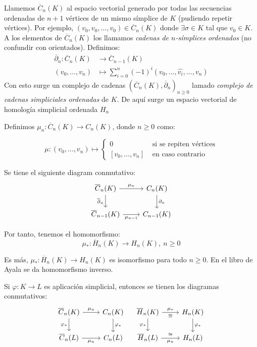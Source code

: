 \documentclass[HS.tex]{subfiles}
\begin{document}
Llamemos $\overline{C}_n(K)$ al espacio vectorial generado por todas las secuencias ordenadas de $n+1$ vértices de un mismo símplice de $K$ (pudiendo repetir vértices).
Por ejemplo, $(v_0,v_0,\dots,v_0) \in \overline{C}_n(K)$ donde $\exists \sigma \in K$ tal que $v_0 \in K$.
A los elementos de $\overline{C}_n(K)$ los llamamos \emph{cadenas de $n$-símplices ordenados} (no confundir con orientados).
Definimos:
\begin{align*}
	\overline{\partial}_n \colon \overline{C}_n(K) & \to \overline{C}_{n-1}(K)\\
	(v_0,\dots,v_n) & \mapsto \sum_{i=0}^n (-1)^i(v_0,\dots,\widehat{v_i},\dots,v_n)
\end{align*}
Con esto surge un complejo de cadenas $(\overline{C}_n(K), \overline{\partial}_n)_{n \geq 0}$ lamado \emph{complejo de cadenas simpliciales ordenadas} de $K$.
De aquí surge un espacio vectorial de homología simplicial ordenada $H_n$

Definimos $\mu_n \colon \overline{C}_n(K) \to C_n(K)$, donde $n \geq 0$ como:

\[ \mu \colon (v_0,\dots,v_n) \mapsto \begin{cases}0 & \text{ si se repiten vértices}\\ [v_0,\dots,v_n] & \text{ en caso contrario}\end{cases}\]

\begin{propi}\mbox{}
Se tiene el siguiente diagram conmutativo:
\[\begin{tikzcd}{\overline{C}_n(K)} \arrow[r,"\mu_n"] \arrow[d,"\overline{\partial}_n" left] & {C_n(K)} \arrow[d,"\partial_n"]\\
{\overline{C}_{n-1}(K)} \arrow[r,"\mu_{n-1}" below] & C_{n-1}(K)
\end{tikzcd}\]

Por tanto, tenemos el homomorfismo:
\[ \mu_* \colon \overline{H}_n(K) \to H_n(K),\ n\geq 0\]

Es más, $\mu_* \colon \overline{H}_n(K) \to H_n(K)$ es isomorfismo para todo $n \geq 0$.
En el libro de Ayala se da homomorfismo inverso.
\end{propi}

\begin{propi}
Si $\varphi \colon K \to L$ es aplicación simplicial, entonces se tienen los diagramas conmutativos:
\[\begin{tikzcd}{\overline{C}_n(K)} \arrow[r,"\mu_n"] \arrow[d,"\varphi_*" left] & {C_n(K)} \arrow[d,"\varphi_*"]\\
{\overline{C}_n(L)} \arrow[r,"\mu_n" below] & C_n(L)
\end{tikzcd} \quad \begin{tikzcd}{\overline{H}_n(K)} \arrow[r,"\mu_*","\cong" below] \arrow[d,"\varphi_*" left] & {H_n(K)} \arrow[d,"\varphi_*"]\\
{\overline{H}_n(L)} \arrow[r,"\mu_n" below,"\cong" above] & H_n(L)
\end{tikzcd}\]
\end{propi}
\end{document}
